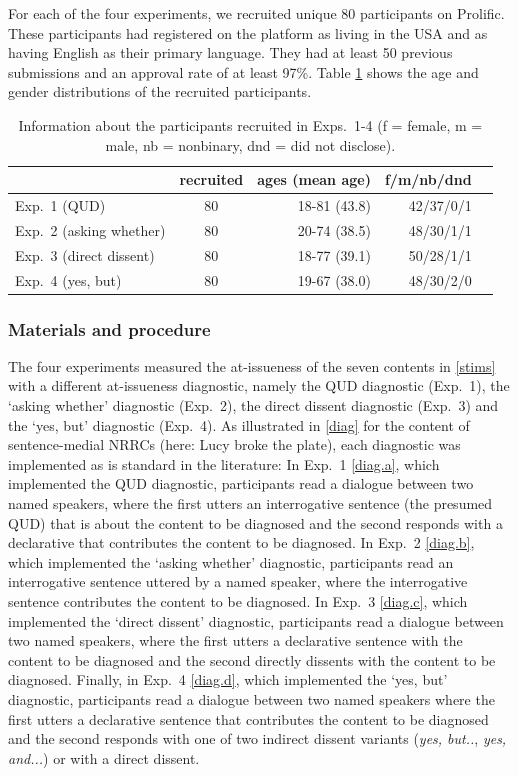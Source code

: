 \documentclass[times,linguex]{glossa}
\begin{document}
  For each of the four experiments, we recruited unique 80 participants on Prolific. These participants had registered on the platform as living in the USA and as having English as their primary language. They had at least 50 previous submissions and an approval rate of at least 97\%.  Table \ref{t:recruited} shows the age and gender distributions of the recruited participants.

  \begin{table}[h!]
  \centering
  \begin{tabular}{l | c | r r r }
              & recruited & ages (mean age) & f/m/nb/dnd \\ \hline
  Exp.~1 (QUD) & 80 & 18-81 (43.8) & 42/37/0/1  \\
  Exp.~2 (asking whether) & 80 & 20-74 (38.5)  & 48/30/1/1  \\
  Exp.~3 (direct dissent) & 80 & 18-77 (39.1) & 50/28/1/1  \\
  Exp.~4 (yes, but) &80 & 19-67 (38.0)  & 48/30/2/0 &  \\
  \hline
  \end{tabular}

  \caption{Information about the participants recruited in Exps.~1-4 (f = female, m = male, nb = nonbinary, dnd = did not disclose).}\label{t:recruited}
  \end{table}

  \subsubsection{Materials and procedure}
  
The four experiments measured the at-issueness of the seven contents in \ref{stims} with a different at-issueness diagnostic, namely the QUD diagnostic (Exp.~1), the `asking whether' diagnostic (Exp.~2), the direct dissent diagnostic (Exp.~3) and the `yes, but' diagnostic (Exp.~4). As illustrated in \ref{diag} for the content of sentence-medial NRRCs (here: Lucy broke the plate), each diagnostic was implemented as is standard in the literature: In Exp.~1 \ref{diag.a}, which implemented the QUD diagnostic, participants read a dialogue between two named speakers, where the first utters an interrogative sentence (the presumed QUD) that is about the content to be diagnosed and the second responds with a declarative that contributes the content to be diagnosed. In Exp.~2 \ref{diag.b}, which implemented the `asking whether' diagnostic, participants read an interrogative sentence uttered by a named speaker, where the interrogative sentence contributes the content to be diagnosed. In Exp.~3 \ref{diag.c}, which implemented the `direct dissent' diagnostic, participants read a dialogue between two named speakers, where the first utters a declarative sentence with the content to be diagnosed and the second directly dissents with the content to be diagnosed. Finally, in Exp.~4 \ref{diag.d}, which implemented the `yes, but' diagnostic, participants read a dialogue between two named speakers where the first utters a declarative sentence that contributes the content to be diagnosed and the second responds with one of two indirect dissent variants (\emph{yes, but..}, \emph{yes, and...}) or with a direct dissent.
\end{document}
